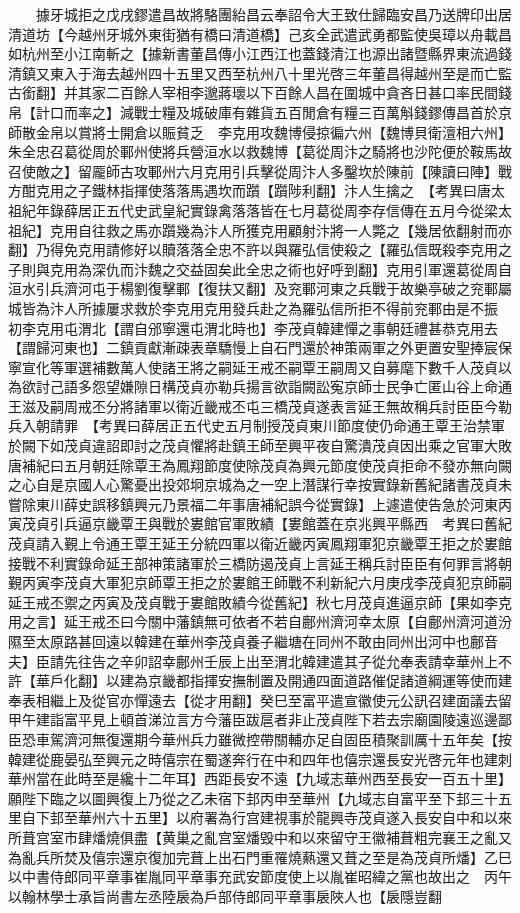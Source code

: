 　　據牙城拒之戊戌鏐遣昌故將駱團紿昌云奉詔令大王致仕歸臨安昌乃送牌印出居清道坊【今越州牙城外東街猶有橋曰清道橋】己亥全武遣武勇都監使吳璋以舟載昌如杭州至小江南斬之【據新書董昌傳小江西江也蓋錢清江也源出諸暨縣界東流過錢清鎮又東入于海去越州四十五里又西至杭州八十里光啓三年董昌得越州至是而亡監古銜翻】并其家二百餘人宰相李邈蔣瓌以下百餘人昌在圍城中貪吝日甚口率民間錢帛【計口而率之】減戰士糧及城破庫有雜貨五百閒倉有糧三百萬斛錢鏐傳昌首於京師散金帛以賞將士開倉以賑貧乏　李克用攻魏博侵掠徧六州【魏博貝衛澶相六州】朱全忠召葛從周於鄆州使將兵營洹水以救魏博【葛從周汴之騎將也沙陀便於鞍馬故召使敵之】留龎師古攻鄆州六月克用引兵擊從周汴人多鑿坎於陳前【陳讀曰陣】戰方酣克用之子鐵林指揮使落落馬遇坎而躓【躓陟利翻】汴人生擒之　【考異曰唐太祖紀年錄薛居正五代史武皇紀實錄禽落落皆在七月葛從周李存信傳在五月今從梁太祖紀】克用自往救之馬亦躓幾為汴人所獲克用顧射汴將一人斃之【幾居依翻射而亦翻】乃得免克用請修好以贖落落全忠不許以與羅弘信使殺之【羅弘信既殺李克用之子則與克用為深仇而汴魏之交益固矣此全忠之術也好呼到翻】克用引軍還葛從周自洹水引兵濟河屯于楊劉復擊鄆【復扶又翻】及兖鄆河東之兵戰于故樂亭破之兖鄆屬城皆為汴人所據屢求救於李克用克用發兵赴之為羅弘信所拒不得前兖鄆由是不振　初李克用屯渭北【謂自邠寧還屯渭北時也】李茂貞韓建憚之事朝廷禮甚恭克用去【謂歸河東也】二鎮貢獻漸疎表章驕慢上自石門還於神策兩軍之外更置安聖捧宸保寧宣化等軍選補數萬人使諸王將之嗣延王戒丕嗣覃王嗣周又自募麾下數千人茂貞以為欲討己語多怨望嫌隙日構茂貞亦勒兵揚言欲詣闕訟寃京師士民争亡匿山谷上命通王滋及嗣周戒丕分將諸軍以衛近畿戒丕屯三橋茂貞遂表言延王無故稱兵討臣臣今勒兵入朝請罪　【考異曰薛居正五代史五月制授茂貞東川節度使仍命通王覃王治禁軍於闕下如茂貞違詔即討之茂貞懼將赴鎮王師至興平夜自驚潰茂貞因出乘之官軍大敗唐補紀曰五月朝廷除覃王為鳳翔節度使除茂貞為興元節度使茂貞拒命不發亦無向闕之心自是京國人心驚憂出投郊坰京城為之一空上潛謀行幸按實錄新舊紀諸書茂貞未嘗除東川薛史誤移鎮興元乃景福二年事唐補紀誤今從實錄】上遽遣使告急於河東丙寅茂貞引兵逼京畿覃王與戰於婁館官軍敗績【婁館蓋在京兆興平縣西　考異曰舊紀茂貞請入覲上令通王覃王延王分統四軍以衛近畿丙寅鳳翔軍犯京畿覃王拒之於婁館接戰不利實錄命延王部神策諸軍於三橋防遏茂貞上言延王稱兵討臣臣有何罪言將朝覲丙寅李茂貞大軍犯京師覃王拒之於婁館王師戰不利新紀六月庚戌李茂貞犯京師嗣延王戒丕禦之丙寅及茂貞戰于婁館敗績今從舊紀】秋七月茂貞進逼京師【果如李克用之言】延王戒丕曰今關中藩鎮無可依者不若自鄜州濟河幸太原【自鄜州濟河道汾隰至太原路甚回遠以韓建在華州李茂貞養子繼塘在同州不敢由同州出河中也鄜音夫】臣請先往告之辛卯詔幸鄜州壬辰上出至渭北韓建遣其子從允奉表請幸華州上不許【華戶化翻】以建為京畿都指揮安撫制置及開通四面道路催促諸道綱運等使而建奉表相繼上及從官亦憚遠去【從才用翻】癸巳至富平遣宣徽使元公訊召建面議去留甲午建詣富平見上頓首涕泣言方今藩臣跋扈者非止茂貞陛下若去宗廟園陵遠巡邊鄙臣恐車駕濟河無復還期今華州兵力雖微控帶關輔亦足自固臣積聚訓厲十五年矣【按韓建從鹿晏弘至興元之時僖宗在蜀遂奔行在中和四年也僖宗還長安光啓元年也建刺華州當在此時至是纔十二年耳】西距長安不遠【九域志華州西至長安一百五十里】願陛下臨之以圖興復上乃從之乙未宿下邽丙申至華州【九域志自富平至下邽三十五里自下邽至華州六十五里】以府署為行宫建視事於龍興寺茂貞遂入長安自中和以來所葺宫室市肆燔燒俱盡【黄巢之亂宫室燔毁中和以來留守王徽補葺粗完襄王之亂又為亂兵所焚及僖宗還京復加完葺上出石門重罹燒爇還又葺之至是為茂貞所燔】乙巳以中書侍郎同平章事崔胤同平章事充武安節度使上以胤崔昭緯之黨也故出之　丙午以翰林學士承旨尚書左丞陸扆為戶部侍郎同平章事扆陜人也【扆隱豈翻